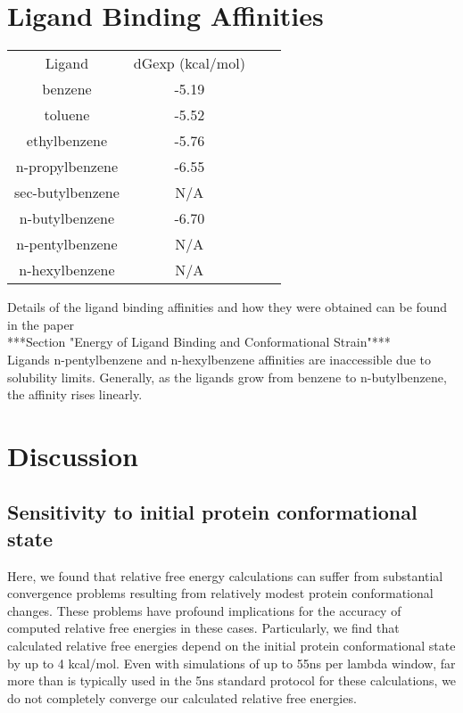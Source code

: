 \documentclass{article}
\begin{document}
\section{Ligand Binding Affinities}
\begin{tabular}{|c|c|c|c|}
\hline
Ligand           & dGexp (kcal/mol) \\
benzene          & -5.19            \\
toluene          & -5.52            \\
ethylbenzene     & -5.76            \\
n-propylbenzene  & -6.55            \\
sec-butylbenzene & N/A              \\
n-butylbenzene   & -6.70            \\
n-pentylbenzene  & N/A              \\
n-hexylbenzene   & N/A              \\
\hline
\end{tabular}

Details of the ligand binding affinities and how they were obtained can be found in the paper \cite{Merski2015} \\
***Section "Energy of Ligand Binding and Conformational Strain"***\\
Ligands n-pentylbenzene and n-hexylbenzene affinities are inaccessible due to solubility limits.
Generally, as the ligands grow from benzene to n-butylbenzene, the affinity rises linearly.

\section{Discussion}
\subsection*{Sensitivity to initial protein conformational state}
Here, we found that relative free energy calculations can suffer from substantial convergence problems resulting from relatively modest protein conformational changes.
These problems have profound implications for the accuracy of computed relative free energies in these cases. 
Particularly, we find that calculated relative free energies depend on the initial protein conformational state by up to 4 kcal/mol. 
Even with simulations of up to 55ns per lambda window, far more than is typically used in the 5ns standard protocol for these calculations, we do not completely converge our calculated relative free energies.
 
\end{document}
